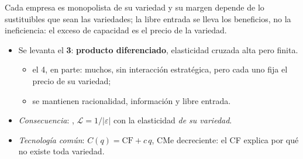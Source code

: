 \documentclass{article}
\begin{document}
\begin{columnas}
\begin{ideaclave}
Cada empresa es monopolista de su variedad y su margen depende de lo sustituibles que sean las variedades; la libre entrada se lleva los beneficios, no la ineficiencia: el exceso de capacidad es el precio de la variedad.
\end{ideaclave}

\begin{itemize}
\item Se levanta el \textbf{3}: \textbf{producto diferenciado}, elasticidad cruzada alta pero finita.
  \begin{itemize}
  \item el 4, en parte: muchos, sin interacción estratégica, pero cada uno fija el precio de su variedad;
  \item se mantienen racionalidad, información y libre entrada.
  \end{itemize}
\item \emph{Consecuencia}: , $\mathcal{L}=1/|\varepsilon|$  con la elasticidad \emph{de su variedad}.
\item \emph{Tecnología común}: $C(q)=\mathrm{CF}+c\,q$, CMe decreciente: el CF explica por qué no existe toda variedad.
\end{itemize}


\end{columnas}
\end{document}
